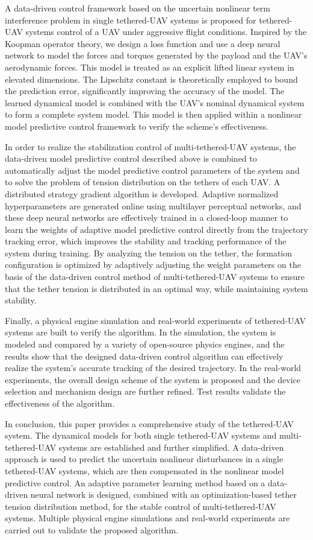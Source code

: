 \documentclass[lang=chs, degree=master, blindreview=false, winfonts=true]{yanputhesis}
\begin{document}
\begin{engabstract}
	A data-driven control framework based on the uncertain nonlinear term interference problem in single tethered-UAV systems is proposed for tethered-UAV systems control of a UAV under aggressive flight conditions. Inspired by the Koopman operator theory, we design a loss function and use a deep neural network to model the forces and torques generated by the payload and the UAV's aerodynamic forces. This model is treated as an explicit lifted linear system in elevated dimensions. The Lipschitz constant is theoretically employed to bound the prediction error, significantly improving the accuracy of the model. The learned dynamical model is combined with the UAV's nominal dynamical system to form a complete system model. This model is then applied within a nonlinear model predictive control framework to verify the scheme's effectiveness.
	
	In order to realize the stabilization control of multi-tethered-UAV systems, the data-driven model predictive control described above is combined to automatically adjust the model predictive control parameters of the system and to solve the problem of tension distribution on the tethers of each UAV. A distributed strategy gradient algorithm is developed. Adaptive normalized hyperparameters are generated online using multilayer perceptual networks, and these deep neural networks are effectively trained in a closed-loop manner to learn the weights of adaptive model predictive control directly from the trajectory tracking error, which improves the stability and tracking performance of the system during training. By analyzing the tension on the tether, the formation configuration is optimized by adaptively adjusting the weight parameters on the basis of the data-driven control method of multi-tethered-UAV systems to ensure that the tether tension is distributed in an optimal way, while maintaining system stability.
	
	
	Finally, a physical engine simulation and real-world experiments of tethered-UAV systems are built to verify the algorithm. In the simulation, the system is modeled and compared by a variety of open-source physics engines, and the results show that the designed data-driven control algorithm can effectively realize the system's accurate tracking of the desired trajectory. In the real-world experiments, the overall design scheme of the system is proposed and the device selection and mechanism design are further refined. Test results validate the effectiveness of the algorithm.
	
	In conclusion, this paper provides a comprehensive study of the tethered-UAV system. The dynamical models for both single tethered-UAV systems and multi-tethered-UAV systems are established and further simplified. A data-driven approach is used to predict the uncertain nonlinear disturbances in a single tethered-UAV systems, which are then compensated in the nonlinear model predictive control. An adaptive parameter learning method based on a data-driven neural network is designed, combined with an optimization-based tether tension distribution method, for the stable control of multi-tethered-UAV systems. Multiple physical engine simulations and real-world experiments are carried out to validate the proposed algorithm.
	

\end{engabstract}
\end{document}
